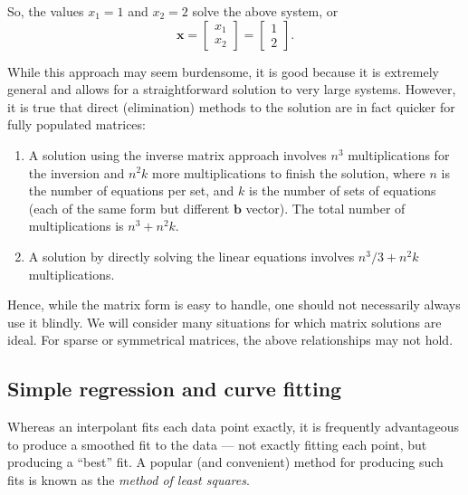 So, the values $x_1 = 1$ and $x_2 = 2$ solve the above system, or
\begin{equation}
\mathbf{x} = \left[ \begin{array}{c}
x_1\\ x_2 \end{array} \right]
=
\left[ \begin{array}{c}
1\\ 2 \end{array} 
\right ] .
\end{equation}	 

While this approach may seem burdensome, it is good because it is extremely general and 
allows for a straightforward solution to very large systems. However, it is 
true that direct (elimination) methods to the solution are in fact quicker for fully populated 
matrices:

\begin{enumerate}
\item 	A solution using the inverse matrix approach involves $n^3$ multiplications for the inversion and $n^2k$ 
more multiplications to finish the solution, where $n$ is the number of equations per set, and $k$ 
is the number of sets of equations (each of the same form but different $\mathbf{b}$ vector). The total 
number of multiplications is $n^3 + n^2k$.
\item	A solution by directly solving the linear equations involves $n^3/3 + n^2k$ multiplications.
\end{enumerate}

Hence, while the matrix form is easy to handle, one should not necessarily always use it blindly. We 
will consider many situations for which matrix solutions are ideal. For sparse or symmetrical 
matrices, the above relationships may not hold.

\subsection{Simple regression and curve fitting}

	Whereas an interpolant fits each data point exactly, it is frequently advantageous to produce a 
smoothed fit to the data --- not exactly fitting each point, but producing a ``best'' fit. A popular (and 
convenient) method for producing such fits is known as the \emph{method of least squares}.

